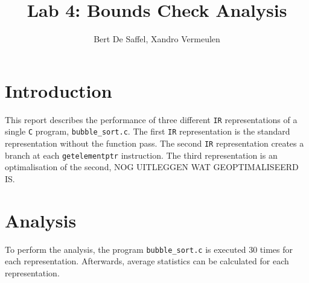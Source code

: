 \documentclass{article}
\title{Lab 4: Bounds Check Analysis}
\author{Bert De Saffel, Xandro Vermeulen}
\begin{document}
	\maketitle
	\tableofcontents
	\section{Introduction}
	This report describes the performance of three different \texttt{IR} representations of a single \texttt{C} program, \texttt{bubble\_sort.c}. The first \texttt{IR} representation is the standard representation without the function pass. The second \texttt{IR} representation creates a branch at each \texttt{getelementptr} instruction. The third representation is an optimalisation of the second, NOG UITLEGGEN WAT GEOPTIMALISEERD IS.
	\section{Analysis}
	To perform the analysis, the program \texttt{bubble\_sort.c} is executed 30 times for each representation. Afterwards, average statistics can be calculated for each representation. 
	
	
	
	
\end{document}
